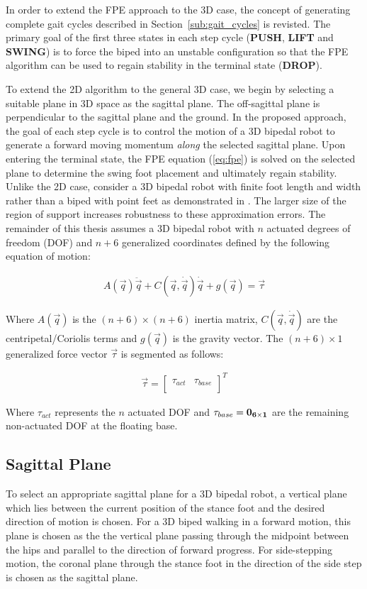 In order to extend the FPE approach to the 3D case, the concept of generating complete gait cycles described in Section~\ref{sub:gait_cycles} is revisted. The primary goal of the first three states in each step cycle (\textbf{PUSH}, \textbf{LIFT} and \textbf{SWING}) is to force the biped into an unstable configuration so that the FPE algorithm can be used to regain stability in the terminal state (\textbf{DROP}).

To extend the 2D algorithm to the general 3D case, we begin by selecting a suitable plane in 3D space as the sagittal plane. The off-sagittal plane is perpendicular to the sagittal plane and the ground.  In the proposed approach, the goal of each step cycle is to control the motion of a 3D bipedal robot to generate a forward moving momentum \emph{along} the selected sagittal plane. Upon entering the terminal state, the FPE equation (\ref{eq:fpe}) is solved on the selected plane to determine the swing foot placement and ultimately regain stability. Unlike the 2D case, consider a 3D bipedal robot with finite foot length and width rather than a biped with point feet as demonstrated in \cite{Wight:2008ii}. The larger size of the region of support increases robustness to these approximation errors. The remainder of this thesis assumes a 3D bipedal robot with $n$ actuated degrees of freedom (DOF) and $n+6$ generalized coordinates defined by the following equation of motion: 

\begin{eqnarray}
	\label{eq:eom}
	A(\vec{q})\ddot{\vec{q}} + C(\vec{q},\dot{\vec{q}})\dot{\vec{q}} + g(\vec{q}) = \vec{\tau}
\end{eqnarray}

Where $A(\vec{q})$ is the $(n+6) \times (n+6)$ inertia matrix, $C(\vec{q},\dot{\vec{q}})$ are the centripetal/Coriolis terms and $g(\vec{q})$ is the gravity vector. The $(n+6) \times 1$ generalized force vector $\vec{\tau}$ is segmented as follows:

\begin{eqnarray}
	\label{eq:gentau}
	\vec{\tau} = {\begin{bmatrix} \tau_{act} & \tau_{base} \\ \end{bmatrix}}^T
\end{eqnarray}

Where $\tau_{act}$ represents the $n$ actuated DOF and $\tau_{base} = \bf{0}_{6 \times 1} $ are the remaining non-actuated DOF at the floating base.

\subsection{Sagittal Plane} %
\label{sub:sagittal_plane}
To select an appropriate sagittal plane for a 3D bipedal robot, a vertical plane which lies between the current position of the stance foot and the desired direction of motion is chosen. For a 3D biped walking in a forward motion, this plane is chosen as the the vertical plane passing through the midpoint between the hips and parallel to the direction of forward progress. For side-stepping motion, the coronal plane through the stance foot in the direction of the side step is chosen as the sagittal plane.

